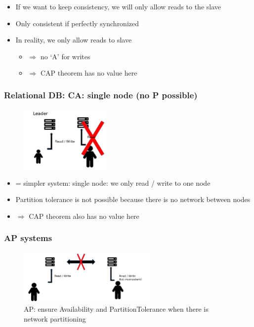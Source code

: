 \documentclass{article}
\begin{document}
\begin{itemize}
    \item If we want to keep consistency, we will only allow reads to the slave
    \item Only consistent if perfectly synchronized
    \item In reality, we only allow reads to slave
    \begin{itemize}
        \item $\Rightarrow$ no `A' for writes
        \item $\Rightarrow$ CAP theorem has no value here
    \end{itemize}
\end{itemize}


\subsubsection{Relational DB: CA: single node (no P possible)}

\begin{figure}[H]
    \centering
    \includegraphics[width=0.4\textwidth]{cap-theorem-ca-single.png}
\end{figure}

\begin{itemize}
    \item = simpler system: single node: we only read / write to one node
    \item Partition tolerance is not possible because there is no network between nodes
    \item $\Rightarrow$ CAP theorem also has no value here
\end{itemize}

\subsubsection{AP systems}

\begin{figure}[H]
    \centering
    \includegraphics[width=0.6\textwidth]{cap-theorem-ap.png}
    \caption{AP: ensure Availability and PartitionTolerance when there is network partitioning}
\end{figure}
\end{document}
